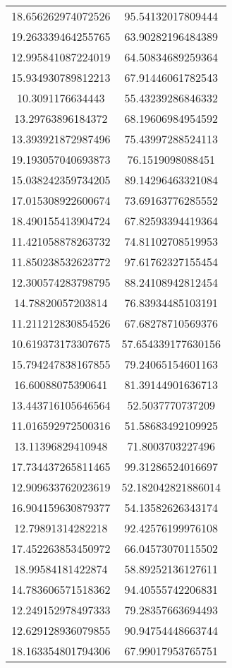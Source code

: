 \begin{table}
\begin{tabular}{cc}
18.656262974072526 & 95.54132017809444 \\
19.263339464255765 & 63.90282196484389 \\
12.995841087224019 & 64.50834689259364 \\
15.934930789812213 & 67.91446061782543 \\
10.3091176634443 & 55.43239286846332 \\
13.29763896184372 & 68.19606984954592 \\
13.393921872987496 & 75.43997288524113 \\
19.193057040693873 & 76.1519098088451 \\
15.038242359734205 & 89.14296463321084 \\
17.015308922600674 & 73.69163776285552 \\
18.490155413904724 & 67.82593394419364 \\
11.421058878263732 & 74.81102708519953 \\
11.850238532623772 & 97.61762327155454 \\
12.300574283798795 & 88.24108942812454 \\
14.78820057203814 & 76.83934485103191 \\
11.211212830854526 & 67.68278710569376 \\
10.619373173307675 & 57.654339177630156 \\
15.794247838167855 & 79.24065154601163 \\
16.60088075390641 & 81.39144901636713 \\
13.443716105646564 & 52.5037770737209 \\
11.016592972500316 & 51.58683492109925 \\
13.11396829410948 & 71.8003703227496 \\
17.734437265811465 & 99.31286524016697 \\
12.909633762023619 & 52.182042821886014 \\
16.904159630879377 & 54.13582626343174 \\
12.79891314282218 & 92.42576199976108 \\
17.452263853450972 & 66.04573070115502 \\
18.99584181422874 & 58.89252136127611 \\
14.783606571518362 & 94.40555742206831 \\
12.249152978497333 & 79.28357663694493 \\
12.629128936079855 & 90.94754448663744 \\
18.163354801794306 & 67.99017953765751 \\

\end{tabular}
\end{table}
